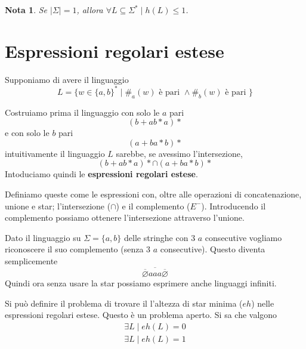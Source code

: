 \documentclass[12pt]{article}
\newtheorem{nota}{Nota}
\begin{document}
\begin{nota}
	Se $|\Sigma| = 1$, allora $\forall L \subseteq \Sigma^* \mid h(L) \leq 1$.
\end{nota}

\section{Espressioni regolari estese}
Supponiamo di avere il linguaggio
$$ L = \{ w \in \{a, b\}^* \mid \#_a(w) \text{ è pari } \wedge \#_b(w) \text{ è pari } \} $$

Costruiamo prima il linguaggio con solo le $a$ pari
$$ (b + ab*a)* $$
e con solo le $b$ pari
$$ (a + ba*b)* $$
intuitivamente il linguaggio $L$ sarebbe, se avessimo l'intersezione, 
$$ (b + ab*a)* \cap (a + ba*b)* $$
Intoduciamo quindi le \textbf{espressioni regolari estese}.

Definiamo queste come le espressioni con, oltre alle operazioni di concatenazione, unione e star; l'intersezione ($\cap$) e il complemento ($E^-$).
Introducendo il complemento possiamo ottenere l'intersezione attraverso l'unione.

\begin{tcolorbox}
	Dato il linguaggio su $\Sigma = \{a, b\}$ delle stringhe con 3 $a$ consecutive
	vogliamo riconoscere il suo complemento (senza 3 $a$ consecutive).
	Questo diventa semplicemente
	$$ \overline{\overline{\varnothing} a a a \overline{\varnothing}} $$
	Quindi ora senza usare la star possiamo esprimere anche linguaggi infiniti.
\end{tcolorbox}
Si può definire il problema di trovare il l'altezza di star minima ($eh$) nelle espressioni regolari estese.
Questo è un problema aperto.
Si sa che valgono
\begin{align*}
	\exists L \mid eh(L) = 0 \\
	\exists L \mid eh(L) = 1 
\end{align*}
\end{document}
